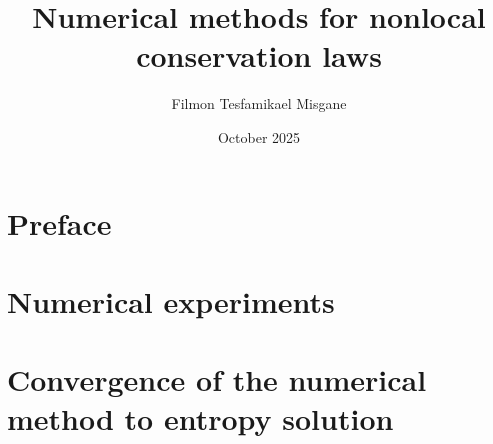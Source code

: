 \documentclass{article}
\title{Numerical methods for nonlocal conservation laws}
\author{Filmon Tesfamikael Misgane}
\date{October 2025}
\begin{document}
\maketitle
\tableofcontents

\section*{Preface}






\section{Numerical experiments}
\section{Convergence of the numerical method to entropy solution}

\printbibliography
\end{document}
